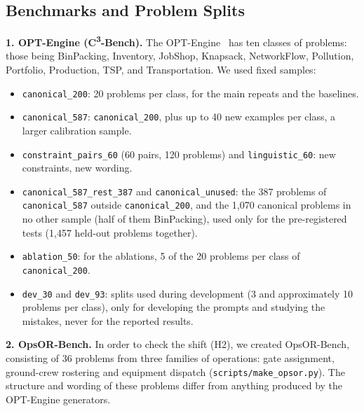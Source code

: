 \documentclass[conference]{IEEEtran}
\newcommand{\cthree}{C\textsuperscript{3}-Bench}
\begin{document}
\subsection{Benchmarks and Problem Splits}
\textbf{1. OPT-Engine (\cthree{}).} The OPT-Engine~\cite{chen2026optengine} has ten classes of problems: those being BinPacking, Inventory, JobShop, Knapsack, NetworkFlow, Pollution, Portfolio, Production, TSP, and Transportation. We used fixed samples:
\begin{itemize}
\item \texttt{canonical\_200}: 20 problems per class, for the main repeats and the baselines.
\item \texttt{canonical\_587}: \texttt{canonical\_200}, plus up to 40 new examples per class, a larger calibration
sample.
\item \texttt{constraint\_pairs\_60} (60 pairs, 120 problems) and \texttt{linguistic\_60}: new constraints, new
wording.
\item \texttt{canonical\_587\_rest\_387} and \texttt{canonical\_unused}: the 387 problems of \texttt{canonical\_587}
outside \texttt{canonical\_200}, and the 1,070 canonical problems in no other sample (half of them BinPacking), used
only for the pre-registered tests (1,457 held-out problems together).
\item \texttt{ablation\_50}: for the ablations, 5 of the 20 problems per class of \texttt{canonical\_200}.
\item \texttt{dev\_30} and \texttt{dev\_93}: splits used during development (3 and approximately 10 problems per class), only for developing the prompts and studying the mistakes, never for the reported results.
\end{itemize}

\textbf{2. OpsOR-Bench.} In order to check the shift (H2), we created OpsOR-Bench, consisting of 36 problems from three families of operations: gate assignment, ground-crew rostering and equipment dispatch (\texttt{scripts/make\_opsor.py}). The structure and wording of these problems differ from anything produced by the OPT-Engine generators.
\end{document}

